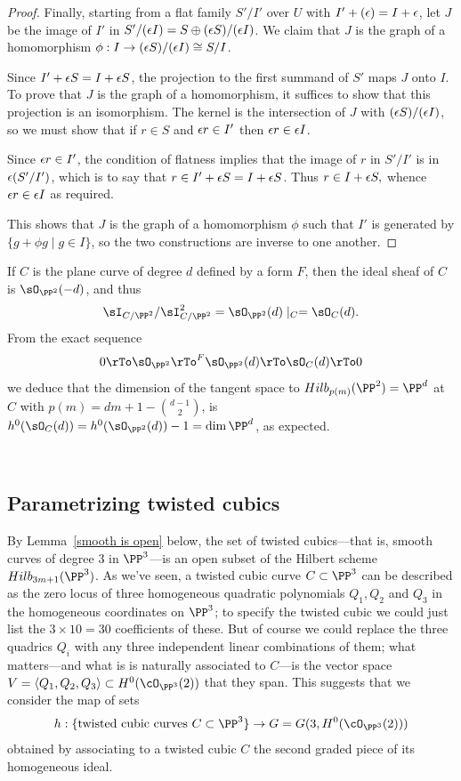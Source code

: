 \begin{proof}
Finally, starting from a flat family $S'/I'$ over $U$ with $I' + (\eps) = I +\eps$, 
let $J$ be the image of $I'$ in $S'/(\eps I) = S \oplus (\eps S)/(\eps I)$. We claim that $J$ is the graph of a homomorphism $\phi: I \to  (\eps S)/(\eps I) \cong S/I$. 

Since $I' + \eps S = I +\eps S$,  the projection  to the first  summand of $S'$ maps $J$ onto $I$. 
To prove that $J$ is the graph of a homomorphism, it suffices to show that this projection is an isomorphism.
The kernel is
the intersection of $J$ with $(\eps S)/(\eps I )$, so we must show that
if $r\in S$ and $\eps r \in I'$ then $\eps r \in \eps I$. 

Since $\eps r \in I'$, the condition of flatness implies
that the image of $r$ in $S'/I'$ is in $\eps(S'/I')$, which is to say that $r \in I' + \eps S = I +\eps S$.
Thus $r \in  I + \eps S,$ whence $\eps  r \in \eps I$ as required.

This shows that
$J$ is the graph of a homomorphism $\phi$ such that
 $I'$ is generated by $\{g+\phi g\mid g\in I\}$, so the two constructions are inverse to one another.
\end{proof}

\begin{example}\label{Hilb for plane curves-continued}
If $C$ is the plane curve of degree $d$ defined by a form $F$, then the ideal sheaf of $C$ is $\sO_{\PP^2}(-d)$, and thus
$$
\sI_{C/\PP^2}/\sI_{C/\PP^2}^2 = \sO_{\PP^2}(d)\mid_C = \sO_C(d).
$$
From the exact sequence 
$$
0\rTo\sO_{\PP^2}\rTo^F\sO_{\PP^2}(d) \rTo\sO_C(d)\rTo 0
$$
we deduce that the dimension of the tangent space to $Hilb_{p(m)}(\PP^2)=\PP^d$  at $C$
with $p(m) = dm+1-{d-1\choose 2}$,
is $h^0(\sO_C(d)) = h^0(\sO_{\PP^2}(d))-1 = \dim \PP^d$, as expected.
\end{example}

\

\subsection{Parametrizing twisted cubics} By Lemma~\ref{smooth is open} below, the set of twisted cubics---that is, smooth curves of degree 3 in $\PP^3$---is an open subset of the Hilbert scheme $Hilb_{3m+1}(\PP^3)$. As we've seen, a twisted cubic curve $C \subset \PP^3$ can be described as the zero locus of three homogeneous quadratic polynomials $Q_1, Q_2$ and $Q_3$ in the homogeneous coordinates on $\PP^3$; to specify the twisted cubic we could just list the $3 \times 10 = 30$ coefficients of these. But of course we could replace the three quadrics $Q_i$ with any three independent linear combinations of them; what matters---and what is is naturally associated to $C$---is the vector space $V = \langle Q_1, Q_2, Q_3 \rangle \subset H^0(\cO_{\PP^3}(2))$ that they span. This suggests that we consider the map of sets
$$
h : \{ \text{twisted cubic curves } C \subset \PP^3 \} \to G = G(3, H^0(\cO_{\PP^3}(2)))
$$
obtained by associating to a twisted cubic $C$ the second graded piece of its homogeneous ideal. 

